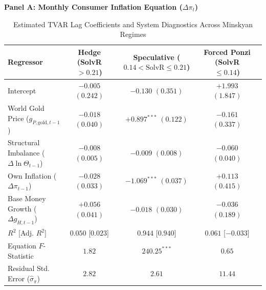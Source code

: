 \begin{table}[htbp]
\centering
\small
\caption{Estimated TVAR Lag Coefficients and System Diagnostics Across Minskyan Regimes}
\label{tab:tvar_parameters}
\label{tab:tvar_parameter_estimates}
\textbf{Panel A: Monthly Consumer Inflation Equation ($\Delta \pi_t$)}\\[0.3em]
\begin{tabularx}{\textwidth}{lcccc}
\toprule
\textbf{Regressor} & \textbf{Hedge (SolvR $> 0.21$)} & \textbf{Speculative ($0.14 < \text{SolvR} \le 0.21$)} & \textbf{Forced Ponzi (SolvR $\le 0.14$)} \\
\midrule
Intercept & $-0.005$ $(0.242)$ & $-0.130$ $(0.351)$ & $+1.993$ $(1.847)$ \\
World Gold Price ($g_{P,\text{gold},t-1}$) & $-0.018$ $(0.040)$ & $+0.897^{***}$ $(0.122)$ & $-0.161$ $(0.337)$ \\
Structural Imbalance ($\Delta \ln \Theta_{t-1}$) & $-0.008$ $(0.005)$ & $-0.009$ $(0.008)$ & $-0.060$ $(0.040)$ \\
Own Inflation ($\Delta \pi_{t-1}$) & $-0.028$ $(0.033)$ & $-1.069^{***}$ $(0.037)$ & $+0.113$ $(0.415)$ \\
Base Money Growth ($\Delta g_{H,t-1}$) & $+0.056$ $(0.041)$ & $-0.018$ $(0.030)$ & $-0.036$ $(0.189)$ \\
\midrule
$R^2$ [Adj. $R^2$] & $0.050$ [$0.023$] & $0.944$ [$0.940$] & $0.061$ [$-0.033$] \\
Equation $F$-Statistic & $1.82$ & $240.25^{***}$ & $0.65$ \\
Residual Std. Error ($\hat{\sigma}_{\pi}$) & $2.82$ & $2.61$ & $11.44$ \\
\bottomrule
\end{tabularx}

\vspace{0.6em}


\end{table}
